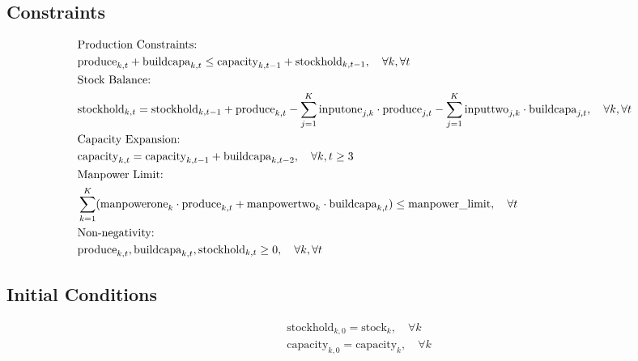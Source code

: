 \documentclass{article}
\begin{document}
\subsection*{Constraints}
\begin{align}
& \text{Production Constraints:} \notag \\
& \text{produce}_{k, t} + \text{buildcapa}_{k, t} \leq \text{capacity}_{k, t-1} + \text{stockhold}_{k, t-1}, \quad \forall k, \forall t \\
& \text{Stock Balance:} \notag \\
& \text{stockhold}_{k, t} = \text{stockhold}_{k, t-1} + \text{produce}_{k, t} - \sum_{j=1}^{K} \text{inputone}_{j, k} \cdot \text{produce}_{j, t} - \sum_{j=1}^{K} \text{inputtwo}_{j, k} \cdot \text{buildcapa}_{j, t}, \quad \forall k, \forall t \\
& \text{Capacity Expansion:} \notag \\
& \text{capacity}_{k, t} = \text{capacity}_{k, t-1} + \text{buildcapa}_{k, t-2}, \quad \forall k, t \geq 3 \\
& \text{Manpower Limit:} \notag \\
& \sum_{k=1}^{K} (\text{manpowerone}_{k} \cdot \text{produce}_{k, t} + \text{manpowertwo}_{k} \cdot \text{buildcapa}_{k, t}) \leq \text{manpower\_limit}, \quad \forall t \\
& \text{Non-negativity:} \notag \\
& \text{produce}_{k, t}, \text{buildcapa}_{k, t}, \text{stockhold}_{k, t} \geq 0, \quad \forall k, \forall t
\end{align}

\subsection*{Initial Conditions}
\begin{align}
& \text{stockhold}_{k, 0} = \text{stock}_k, \quad \forall k \\
& \text{capacity}_{k, 0} = \text{capacity}_k, \quad \forall k
\end{align}
\end{document}
